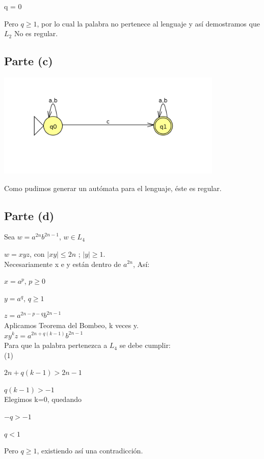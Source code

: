 \documentclass[11pt,letterpaper]{article}
\begin{document}
q = 0

Pero $q \geqslant 1$, por lo cual la palabra no pertenece al lenguaje y así demostramos que $L_{2}$ No es regular.

\subsection{Parte (c)}
\includegraphics[height=5cm]{tarea_3-c.png}

Como pudimos generar un autómata para el lenguaje, éste es regular.


\subsection{Parte (d)}
Sea $w = a^{2n}b^{2n-1}$, $w \in  L_{4}$

$w = xyz$, con $|xy| \leqslant 2n$ ; $|y| \geqslant 1$.
 \\

Necesariamente x e y están dentro de $a^{2n}$, Así:

$x = a^p$, $p \geqslant 0$

$y = a^q$, $q \geqslant 1$

$z = a^{2n-p-q}b^{2n-1}$
 \\

Aplicamos Teorema del Bombeo, k veces y.
 \\
 
$xy^kz = a^{2n+q(k-1)}b^{2n-1}$
 \\

Para que la palabra pertenezca a $L_{4}$ se debe cumplir:
 \\
 
(1)

$2n+q(k-1) > 2n-1$

$q(k-1) > -1$
 \\
 
Elegimos k=0, quedando

$-q > -1$

$q < 1$

Pero $q \geqslant 1$, existiendo así una contradicción.
 \\
 
\end{document}
